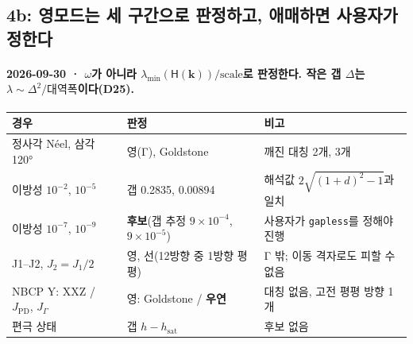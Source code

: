 \subsection{4b: 영모드는 세 구간으로 판정하고, 애매하면 사용자가 정한다}\label{stage4b-zero-modes}
\begingroup%
  \framesubtitle{2026-09-30 · $\omega$가 아니라 $\lambda_{\min}(\mathsf H(\mathbf k))/\text{scale}$로 판정한다. 작은 갭 $\Delta$는 $\lambda\sim\Delta^2/\text{대역폭}$이다(D25).}
  \footnotesize\renewcommand{\arraystretch}{1.08}
  \begin{tabularx}{\textwidth}{@{}P{3.3cm}P{3.6cm}Y@{}}
    \toprule
    경우 & 판정 & 비고 \\
    \midrule
    정사각 Néel, 삼각 120° & 영(Γ), Goldstone & 깨진 대칭 2개, 3개 \\
    이방성 $10^{-2}$, $10^{-5}$ & 갭 0.2835, 0.00894 & 해석값 $2\sqrt{(1+d)^2-1}$과 일치 \\
    이방성 $10^{-7}$, $10^{-9}$ & \textbf{후보}(갭 추정 $9\times10^{-4}$, $9\times10^{-5}$) & 사용자가 \texttt{gapless}를 정해야 진행 \\
    J1--J2, $J_2=J_1/2$ & 영, 선(12방향 중 1방향 평평) & Γ 밖; 이동 격자로도 피할 수 없음 \\
    NBCP Y: XXZ / $J_{\mathrm{PD}}$, $J_\Gamma$ & 영: Goldstone / \textbf{우연} & 대칭 없음, 고전 평평 방향 1개 \\
    편극 상태 & 갭 $h-h_{\mathrm{sat}}$ & 후보 없음 \\
    \bottomrule
  \end{tabularx}
  \par\medskip
\endgroup


